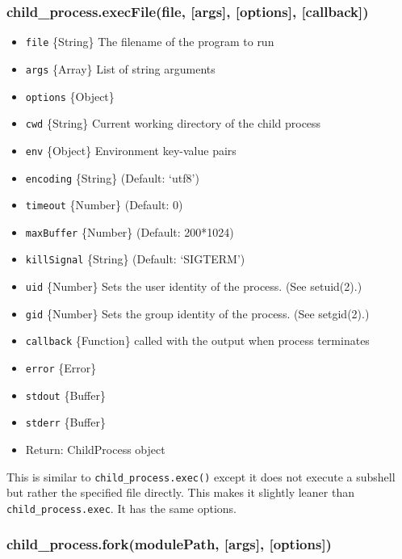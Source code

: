 \subsubsection{child\_process.execFile(file, {[}args{]}, {[}options{]},
{[}callback{]})}\label{childux5fprocess.execfilefile-args-options-callback}

\begin{itemize}
\itemsep1pt\parskip0pt
\item
  \texttt{file} \{String\} The filename of the program to run
\item
  \texttt{args} \{Array\} List of string arguments
\item
  \texttt{options} \{Object\}
\item
  \texttt{cwd} \{String\} Current working directory of the child process
\item
  \texttt{env} \{Object\} Environment key-value pairs
\item
  \texttt{encoding} \{String\} (Default: `utf8')
\item
  \texttt{timeout} \{Number\} (Default: 0)
\item
  \texttt{maxBuffer} \{Number\} (Default: 200*1024)
\item
  \texttt{killSignal} \{String\} (Default: `SIGTERM')
\item
  \texttt{uid} \{Number\} Sets the user identity of the process. (See
  setuid(2).)
\item
  \texttt{gid} \{Number\} Sets the group identity of the process. (See
  setgid(2).)
\item
  \texttt{callback} \{Function\} called with the output when process
  terminates
\item
  \texttt{error} \{Error\}
\item
  \texttt{stdout} \{Buffer\}
\item
  \texttt{stderr} \{Buffer\}
\item
  Return: ChildProcess object
\end{itemize}

This is similar to \texttt{child\_process.exec()} except it does not
execute a subshell but rather the specified file directly. This makes it
slightly leaner than \texttt{child\_process.exec}. It has the same
options.

\subsubsection{child\_process.fork(modulePath, {[}args{]},
{[}options{]})}\label{childux5fprocess.forkmodulepath-args-options}

